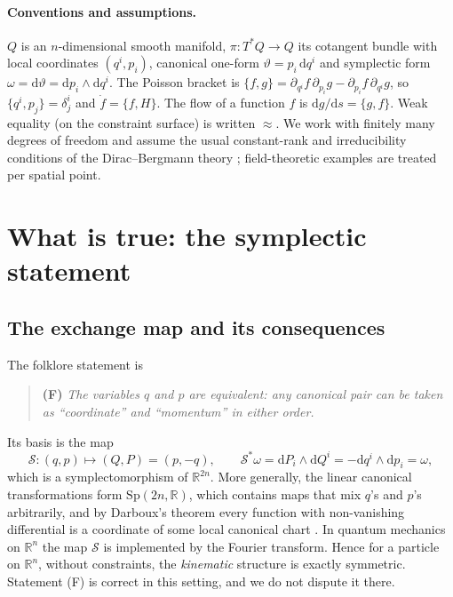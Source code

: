 \documentclass[11pt,a4paper]{article}
\theoremstyle{definition}
\theoremstyle{remark}
\newcommand{\dd}{\mathrm{d}}
\newcommand{\R}{\mathbb{R}}
\newcommand{\PB}[2]{\{#1,#2\}}
\newcommand{\weq}{\approx}
\newcommand{\Sw}{\mathcal{S}}
\begin{document}
\paragraph{Conventions and assumptions.}
$Q$ is an $n$-dimensional smooth manifold, $\pi:T^*Q\to Q$ its cotangent bundle with local coordinates $(q^i,p_i)$, canonical one-form $\vartheta=p_i\,\dd q^i$ and symplectic form $\omega=\dd\vartheta=\dd p_i\wedge\dd q^i$. The Poisson bracket is $\PB fg=\partial_{q^i}f\,\partial_{p_i}g-\partial_{p_i}f\,\partial_{q^i}g$, so $\PB{q^i}{p_j}=\delta^i_j$ and $\dot f=\PB fH$. The flow of a function $f$ is $\dd g/\dd s=\PB gf$. Weak equality (on the constraint surface) is written $\weq$. We work with finitely many degrees of freedom and assume the usual constant-rank and irreducibility conditions of the Dirac--Bergmann theory \cite{gnh,ht}; field-theoretic examples are treated per spatial point.

\section{What is true: the symplectic statement}

\subsection{The exchange map and its consequences}

The folklore statement is
\begin{quote}
\textbf{(F)} \emph{The variables $q$ and $p$ are equivalent: any canonical pair can be taken as ``coordinate'' and ``momentum'' in either order.}
\end{quote}
Its basis is the map
\begin{equation}\label{eq:swap}
\Sw:(q,p)\longmapsto(Q,P)=(p,-q),\qquad \Sw^*\omega=\dd P_i\wedge\dd Q^i=-\dd q^i\wedge\dd p_i=\omega ,
\end{equation}
which is a symplectomorphism of $\R^{2n}$. More generally, the linear canonical transformations form $\mathrm{Sp}(2n,\R)$, which contains maps that mix $q$'s and $p$'s arbitrarily, and by Darboux's theorem every function with non-vanishing differential is a coordinate of some local canonical chart \cite{arnold,am}. In quantum mechanics on $\R^n$ the map $\Sw$ is implemented by the Fourier transform. Hence for a particle on $\R^n$, without constraints, the \emph{kinematic} structure is exactly symmetric. Statement (F) is correct in this setting, and we do not dispute it there.
\end{document}
